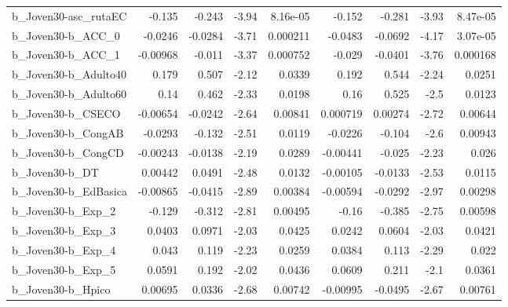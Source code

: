 \begin{tabular}{lrrrrrrrr}
b\_Joven30-asc\_rutaEC       &      -0.135 &       -0.243 &     -3.94 & 8.16e-05 &     -0.152 &      -0.281 &        -3.93 &      8.47e-05 \\
b\_Joven30-b\_ACC\_0          &     -0.0246 &      -0.0284 &     -3.71 & 0.000211 &    -0.0483 &     -0.0692 &        -4.17 &      3.07e-05 \\
b\_Joven30-b\_ACC\_1          &    -0.00968 &       -0.011 &     -3.37 & 0.000752 &     -0.029 &     -0.0401 &        -3.76 &      0.000168 \\
b\_Joven30-b\_Adulto40       &       0.179 &        0.507 &     -2.12 &   0.0339 &      0.192 &       0.544 &        -2.24 &        0.0251 \\
b\_Joven30-b\_Adulto60       &        0.14 &        0.462 &     -2.33 &   0.0198 &       0.16 &       0.525 &         -2.5 &        0.0123 \\
b\_Joven30-b\_CSECO          &    -0.00654 &      -0.0242 &     -2.64 &  0.00841 &   0.000719 &     0.00274 &        -2.72 &       0.00644 \\
b\_Joven30-b\_CongAB         &     -0.0293 &       -0.132 &     -2.51 &   0.0119 &    -0.0226 &      -0.104 &         -2.6 &       0.00943 \\
b\_Joven30-b\_CongCD         &    -0.00243 &      -0.0138 &     -2.19 &   0.0289 &   -0.00441 &      -0.025 &        -2.23 &         0.026 \\
b\_Joven30-b\_DT             &     0.00442 &       0.0491 &     -2.48 &   0.0132 &   -0.00105 &     -0.0133 &        -2.53 &        0.0115 \\
b\_Joven30-b\_EdBasica       &    -0.00865 &      -0.0415 &     -2.89 &  0.00384 &   -0.00594 &     -0.0292 &        -2.97 &       0.00298 \\
b\_Joven30-b\_Exp\_2          &      -0.129 &       -0.312 &     -2.81 &  0.00495 &      -0.16 &      -0.385 &        -2.75 &       0.00598 \\
b\_Joven30-b\_Exp\_3          &      0.0403 &       0.0971 &     -2.03 &   0.0425 &     0.0242 &      0.0604 &        -2.03 &        0.0421 \\
b\_Joven30-b\_Exp\_4          &       0.043 &        0.119 &     -2.23 &   0.0259 &     0.0384 &       0.113 &        -2.29 &         0.022 \\
b\_Joven30-b\_Exp\_5          &      0.0591 &        0.192 &     -2.02 &   0.0436 &     0.0609 &       0.211 &         -2.1 &        0.0361 \\
b\_Joven30-b\_Hpico          &     0.00695 &       0.0336 &     -2.68 &  0.00742 &   -0.00995 &     -0.0495 &        -2.67 &       0.00761 \\

\end{tabular}
